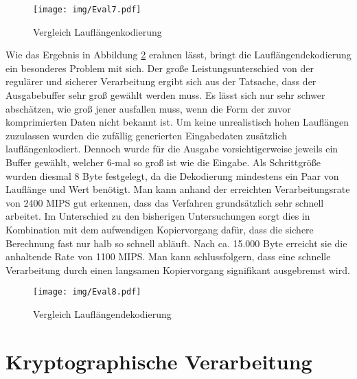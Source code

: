 \begin{figure}[h]
	\texttt{[image: img/Eval7.pdf]}
	\centering
	\caption{Vergleich Lauflängenkodierung}
	\label{fig:eval7}
\end{figure}

Wie das Ergebnis in Abbildung \ref{fig:eval8} erahnen lässt, bringt die Lauflängendekodierung ein besonderes Problem mit sich. Der große Leistungsunterschied von der regulärer und sicherer Verarbeitung ergibt sich aus der Tatsache, dass der Ausgabebuffer sehr groß gewählt werden muss. Es lässt sich nur sehr schwer abschätzen, wie groß jener ausfallen muss, wenn die Form der zuvor komprimierten Daten nicht bekannt ist. Um keine unrealistisch hohen Lauflängen zuzulassen wurden die zufällig generierten Eingabedaten zusätzlich lauflängenkodiert. Dennoch wurde für die Ausgabe vorsichtigerweise jeweils ein Buffer gewählt, welcher 6-mal so groß ist wie die Eingabe. Als Schrittgröße wurden diesmal 8 Byte festgelegt, da die Dekodierung mindestens ein Paar von Lauflänge und Wert benötigt. Man kann anhand der erreichten Verarbeitungsrate von 2400 MIPS gut erkennen, dass das Verfahren grundsätzlich sehr schnell arbeitet. Im Unterschied zu den bisherigen Untersuchungen sorgt dies in Kombination mit dem aufwendigen Kopiervorgang dafür, dass die sichere Berechnung fast nur halb so schnell abläuft. Nach ca. 15.000 Byte erreicht sie die anhaltende Rate von 1100 MIPS. Man kann schlussfolgern, dass eine schnelle Verarbeitung durch einen langsamen Kopiervorgang signifikant ausgebremst wird.

\begin{figure}[h]
	\texttt{[image: img/Eval8.pdf]}
	\centering
	\caption{Vergleich Lauflängendekodierung}
	\label{fig:eval8}
\end{figure}

\section{Kryptographische Verarbeitung}

